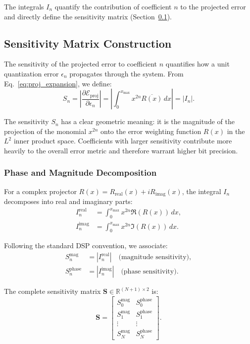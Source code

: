 The integrals $I_n$ quantify the contribution of coefficient $n$ to the projected error and directly define the sensitivity matrix (Section~\ref{sec:sensitivity_matrix}).

\subsection{Sensitivity Matrix Construction}
\label{sec:sensitivity_matrix}

The sensitivity of the projected error to coefficient $n$ quantifies how a unit quantization error $\epsilon_n$ propagates through the system. From Eq.~\eqref{eq:proj_expansion}, we define:
\begin{equation}
S_n = \left|\frac{\partial \mathcal{E}_{\text{proj}}}{\partial \epsilon_n}\right| = \left|\int_{0}^{x_{\max}} x^{2n} \overline{R(x)} \, dx\right| = |I_n|.
\label{eq:sensitivity}
\end{equation}

The sensitivity $S_n$ has a clear geometric meaning: it is the magnitude of the projection of the monomial $x^{2n}$ onto the error weighting function $R(x)$ in the $L^2$ inner product space. Coefficients with larger sensitivity contribute more heavily to the overall error metric and therefore warrant higher bit precision.

\subsubsection{Phase and Magnitude Decomposition}

For a complex projector $R(x) = R_{\text{real}}(x) + i R_{\text{imag}}(x)$, the integral $I_n$ decomposes into real and imaginary parts:
\begin{align}
I_n^{\text{real}} &= \int_{0}^{x_{\max}} x^{2n} \Re(R(x)) \, dx, \label{eq:I_real} \\
I_n^{\text{imag}} &= \int_{0}^{x_{\max}} x^{2n} \Im(R(x)) \, dx. \label{eq:I_imag}
\end{align}

Following the standard DSP convention, we associate:
\begin{align}
S_n^{\text{mag}} &= |I_n^{\text{real}}| \quad \text{(magnitude sensitivity)}, \label{eq:mag_sens} \\
S_n^{\text{phase}} &= |I_n^{\text{imag}}| \quad \text{(phase sensitivity)}. \label{eq:phase_sens}
\end{align}

The complete sensitivity matrix $\mathbf{S} \in \mathbb{R}^{(N+1) \times 2}$ is:
\begin{equation}
\mathbf{S} = \begin{bmatrix}
S_0^{\text{mag}} & S_0^{\text{phase}} \\
S_1^{\text{mag}} & S_1^{\text{phase}} \\
\vdots & \vdots \\
S_N^{\text{mag}} & S_N^{\text{phase}}
\end{bmatrix}.
\label{eq:sensitivity_matrix}
\end{equation}

